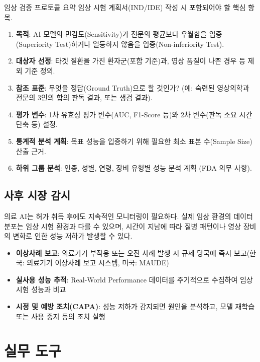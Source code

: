 \begin{practicaltool}{임상 검증 프로토콜 요약}
임상 시험 계획서(IND/IDE) 작성 시 포함되어야 할 핵심 항목.

\begin{enumerate}
 \item \textbf{목적}: AI 모델의 민감도(Sensitivity)가 전문의 평균보다 우월함을 입증(Superiority Test)하거나 열등하지 않음을 입증(Non-inferiority Test).
 \item \textbf{대상자 선정}: 타겟 질환을 가진 환자군(포함 기준)과, 영상 품질이 나쁜 경우 등 제외 기준 정의.
 \item \textbf{참조 표준}: 무엇을 정답(Ground Truth)으로 할 것인가? (예: 숙련된 영상의학과 전문의 3인의 합의 판독 결과, 또는 생검 결과).
 \item \textbf{평가 변수}: 1차 유효성 평가 변수(AUC, F1-Score 등)와 2차 변수(판독 소요 시간 단축 등) 설정.
 \item \textbf{통계적 분석 계획}: 목표 성능을 입증하기 위해 필요한 최소 표본 수(Sample Size) 산출 근거.
 \item \textbf{하위 그룹 분석}: 인종, 성별, 연령, 장비 유형별 성능 분석 계획 (FDA 의무 사항).
\end{enumerate}
\end{practicaltool}

\subsection{사후 시장 감시}
\label{sec:16.6.1}

의료 AI는 허가 취득 후에도 지속적인 모니터링이 필요하다. 실제 임상 환경의 데이터 분포는 임상 시험 환경과 다를 수 있으며, 시간이 지남에 따라 질병 패턴이나 영상 장비의 변화로 인한 성능 저하가 발생할 수 있다.

\begin{itemize}
 \item \textbf{이상사례 보고}: 의료기기 부작용 또는 오진 사례 발생 시 규제 당국에 즉시 보고(한국: 의료기기 이상사례 보고 시스템, 미국: MAUDE)
 \item \textbf{실사용 성능 추적}: Real-World Performance 데이터를 주기적으로 수집하여 임상 시험 성능과 비교
 \item \textbf{시정 및 예방 조치(CAPA)}: 성능 저하가 감지되면 원인을 분석하고, 모델 재학습 또는 사용 중지 등의 조치 실행
\end{itemize}

\section{실무 도구}
\label{sec:16.7}

